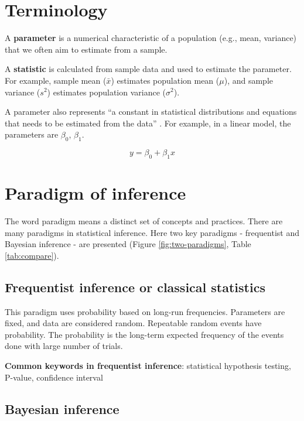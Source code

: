 \documentclass[
]{book}
\begin{document}
\section{Terminology}\label{terminology}

A \textbf{parameter} is a numerical characteristic of a population (e.g., mean, variance) that we often aim to estimate from a sample.

A \textbf{statistic} is calculated from sample data and used to estimate the parameter. For example, sample mean (\(\bar{x}\)) estimates population mean (\(\mu\)), and sample variance (\(s^2\)) estimates population variance (\(\sigma^2\)).

A parameter also represents ``a constant in statistical distributions and equations that needs to be estimated from the data'' \citep{gotelli2013}. For example, in a linear model, the parameters are \(\beta_0\), \(\beta_1\).

\[y = \beta_0 + \beta_1 x\]

\section{Paradigm of inference}\label{paradigm-of-inference}

The word paradigm means a distinct set of concepts and practices. There are many paradigms in statistical inference. Here two key paradigms - frequentist and Bayesian inference - are presented (Figure \ref{fig:two-paradigms}, Table \ref{tab:compare}).

\subsection{Frequentist inference or classical statistics}\label{frequentist-inference-or-classical-statistics}

This paradigm uses probability based on long-run frequencies. Parameters are fixed, and data are considered random. Repeatable random events have probability. The probability is the long-term expected frequency of the events done with large number of trials.

\textbf{Common keywords in frequentist inference}: statistical hypothesis testing, P-value, confidence interval

\subsection{Bayesian inference}\label{bayesian-inference}
\end{document}
